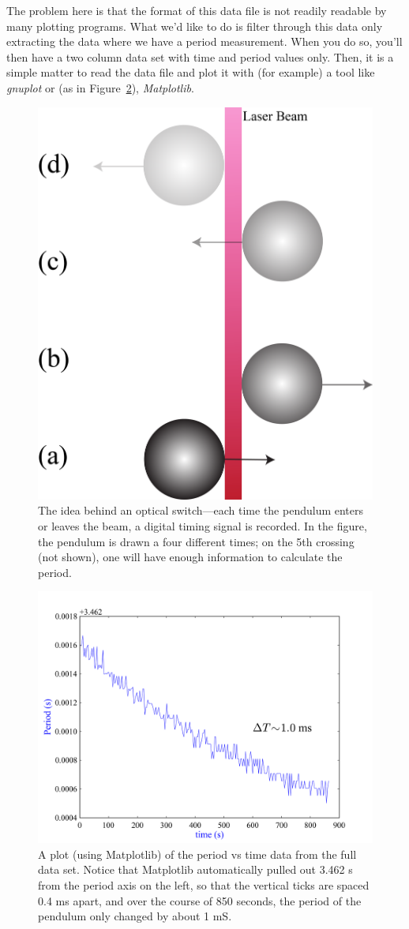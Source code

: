 \begin{prob}
The problem here is that the format of this data file is not readily readable by many plotting programs. What we'd like to do is filter through this data only extracting the data where we have a period measurement. When you do so, you'll then have a two column data set with time and period values only. Then, it is a simple matter to read the data file and plot it with (for example) a tool like {\em gnuplot} or (as in Figure~\ref{fig:Output}), {\em Matplotlib}. 
\begin{figure}[ht]
\sidecaption
  \includegraphics[width=.4\linewidth]{Figures/extractingData/OpticalSwitch.png}%
  \caption{The idea behind an optical switch---each time the pendulum enters or leaves the beam, a digital timing signal is recorded. In the figure, the pendulum is drawn a four different times; on the 5th crossing (not shown), one will have enough information to calculate the period.}
  \label{fig:opticalSwitch}%
\end{figure}

\begin{figure}[htb]\centering
 \includegraphics[width=0.85\linewidth]{Figures/extractingData/Output.png}%
  \caption{A plot (using Matplotlib) of the period vs time data from the full data set. Notice that Matplotlib automatically pulled out 3.462 s from the period axis on the left, so that the vertical ticks are spaced 0.4 ms apart, and over the course of 850 seconds, the period of the pendulum only changed by about 1 mS.}
  \label{fig:Output}%
\end{figure}



\end{prob}
